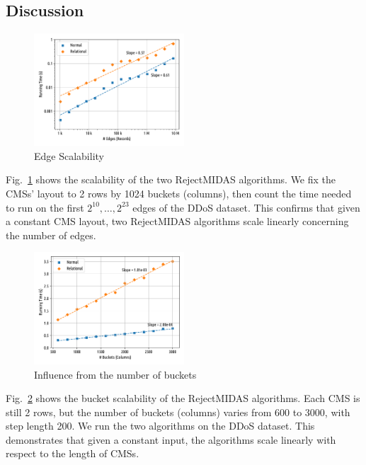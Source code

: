 \documentclass[5p]{elsarticle}
\begin{document}
	\subsection{Discussion}

	\begin{figure}[!htb]
		\centering
		\includegraphics[width=0.5\textwidth]{img/Scalability.Edge.pdf}
		\caption{Edge Scalability}\label{fig:Scalability.Edge}
	\end{figure}

	Fig.~\ref{fig:Scalability.Edge} shows the scalability of the two RejectMIDAS algorithms. We fix the CMSs' layout to 2 rows by 1024 buckets (columns), then count the time needed to run on the first $2^{10}, \ldots, 2^{23}$ edges of the DDoS dataset. This confirms that given a constant CMS layout, two RejectMIDAS algorithms scale linearly concerning the number of edges.

	\begin{figure}[!htb]
		\centering
		\includegraphics[width=0.5\textwidth]{img/Scalability.Bucket.pdf}
		\caption{Influence from the number of buckets}\label{fig:Scalability.Bucket}
	\end{figure}

	Fig.~\ref{fig:Scalability.Bucket} shows the bucket scalability of the RejectMIDAS algorithms. Each CMS is still 2 rows, but the number of buckets (columns) varies from 600 to 3000, with step length 200. We run the two algorithms on the DDoS dataset. This demonstrates that given a constant input, the algorithms scale linearly with respect to the length of CMSs.
\end{document}
